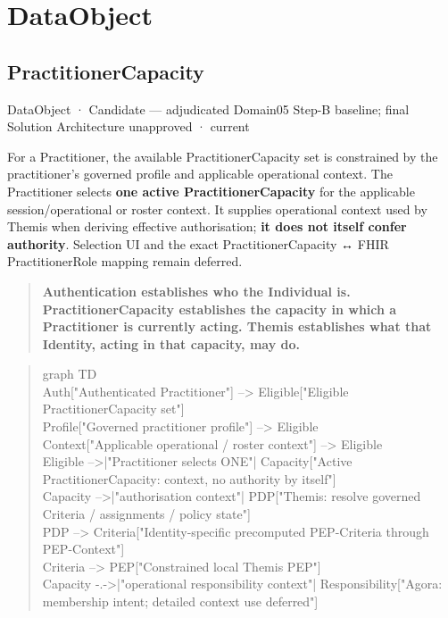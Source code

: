 \section{DataObject}

\subsection{PractitionerCapacity}

\label{element:008f622bf9ce4d40b8a85024748bd485}
{\small DataObject · Candidate — adjudicated Domain05 Step-B baseline; final Solution Architecture unapproved · current}\par

For a Practitioner, the available PractitionerCapacity set is constrained by
the practitioner's governed profile and applicable operational context. The
Practitioner selects \textbf{one active PractitionerCapacity} for the applicable
session/operational or roster context. It supplies operational context used by
Themis when deriving effective authorisation; \textbf{it does not itself confer authority}.
Selection UI and the exact PractitionerCapacity ↔ FHIR PractitionerRole mapping
remain deferred.



\begin{quote}


\textbf{Authentication establishes who the Individual is. PractitionerCapacity
establishes the capacity in which a Practitioner is currently acting. Themis
establishes what that Identity, acting in that capacity, may do.}



\end{quote}


\begin{quote}\small\ttfamily
graph TD\\
    Auth["Authenticated Practitioner"] --> Eligible["Eligible PractitionerCapacity set"]\\
    Profile["Governed practitioner profile"] --> Eligible\\
    Context["Applicable operational / roster context"] --> Eligible\\
    Eligible -->|"Practitioner selects ONE"| Capacity["Active PractitionerCapacity: context, no authority by itself"]\\
    Capacity -->|"authorisation context"| PDP["Themis: resolve governed Criteria / assignments / policy state"]\\
    PDP --> Criteria["Identity-specific precomputed PEP-Criteria through PEP-Context"]\\
    Criteria --> PEP["Constrained local Themis PEP"]\\
    Capacity -.->|"operational responsibility context"| Responsibility["Agora: membership intent; detailed context use deferred"]\\

\end{quote}


